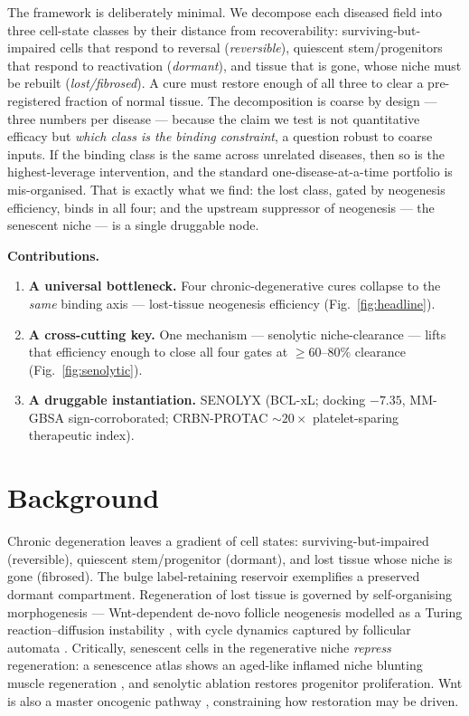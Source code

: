 \documentclass[11pt,a4paper]{article}
\begin{document}
The framework is deliberately minimal. We decompose each diseased field into three
cell-state classes by their distance from recoverability: surviving-but-impaired cells that
respond to reversal (\emph{reversible}), quiescent stem/progenitors that respond to
reactivation (\emph{dormant}), and tissue that is gone, whose niche must be rebuilt
(\emph{lost/fibrosed}). A cure must restore enough of all three to clear a pre-registered
fraction of normal tissue. The decomposition is coarse by design --- three numbers per
disease --- because the claim we test is not quantitative efficacy but \emph{which class is
the binding constraint}, a question robust to coarse inputs. If the binding class is the same
across unrelated diseases, then so is the highest-leverage intervention, and the standard
one-disease-at-a-time portfolio is mis-organised. That is exactly what we find: the lost class,
gated by neogenesis efficiency, binds in all four; and the upstream suppressor of neogenesis
--- the senescent niche --- is a single druggable node.

\medskip\noindent\textbf{Contributions.}
\begin{enumerate}\itemsep0.3em
\item \textbf{A universal bottleneck.} Four chronic-degenerative cures collapse to the
\emph{same} binding axis --- lost-tissue neogenesis efficiency (Fig.~\ref{fig:headline}).
\item \textbf{A cross-cutting key.} One mechanism --- senolytic niche-clearance --- lifts
that efficiency enough to close all four gates at $\geq 60$--$80\%$ clearance
(Fig.~\ref{fig:senolytic}).
\item \textbf{A druggable instantiation.} SENOLYX (BCL-xL; docking $-7.35$, MM-GBSA
sign-corroborated; CRBN-PROTAC ${\sim}20\times$ platelet-sparing therapeutic index).
\end{enumerate}

\section{Background}
\label{sec:bg}
Chronic degeneration leaves a gradient of cell states: surviving-but-impaired (reversible),
quiescent stem/progenitor (dormant), and lost tissue whose niche is gone (fibrosed). The
bulge label-retaining reservoir \citep{cotsarelis1990} exemplifies a preserved dormant
compartment. Regeneration of lost tissue is governed by self-organising morphogenesis ---
Wnt-dependent de-novo follicle neogenesis \citep{ito2007} modelled as a Turing
reaction--diffusion instability \citep{turing1952}, with cycle dynamics captured by
follicular automata \citep{halloy2000}. Critically, senescent cells in the regenerative
niche \emph{repress} regeneration: a senescence atlas shows an aged-like inflamed niche
blunting muscle regeneration \citep{moiseeva2023}, and senolytic ablation restores
progenitor proliferation. Wnt is also a master oncogenic pathway \citep{clevers2012},
constraining how restoration may be driven.
\end{document}
